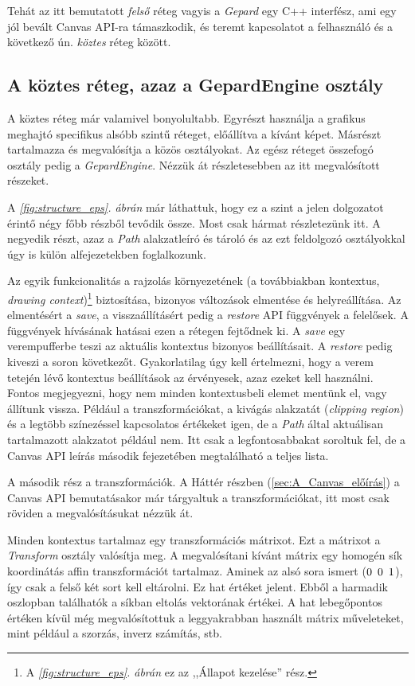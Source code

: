 \documentclass[12pt]{report}
\theoremstyle{definition}
\newcommand{\inenglish}[1]{\textsl{#1}}
\newcommand{\func}[1]{{\textsl{#1}}}
\begin{document}
Tehát az itt bemutatott \emph{felső} réteg vagyis a \func{Gepard} egy C++
interfész, ami egy jól bevált Canvas API-ra támaszkodik, és teremt kapcsolatot
a felhasználó és a következő ún. \emph{köztes} réteg között.

    \subsection*{A köztes réteg, azaz a GepardEngine osztály}

A köztes réteg már valamivel bonyolultabb. Egyrészt használja a grafikus
meghajtó specifikus alsóbb szintű réteget, előállítva a kívánt képet. Másrészt
tartalmazza és megvalósítja a közös osztályokat. Az egész réteget összefogó
osztály pedig a \func{GepardEngine}. Nézzük át részletesebben az itt
megvalósított részeket.

A \emph{\ref{fig:structure_eps}. ábrán} már láthattuk, hogy ez a szint a jelen
dolgozatot érintő négy főbb részből tevődik össze. Most csak hármat
részletezünk itt. A negyedik részt, azaz a \emph{Path} alakzatleíró és tároló
és az ezt feldolgozó osztályokkal úgy is külön alfejezetekben foglalkozunk.

Az egyik funkcionalitás a rajzolás környezetének (a továbbiakban kontextus,
\inenglish{drawing context})\footnote{A \emph{\ref{fig:structure_eps}. ábrán} ez az
,,Állapot kezelése'' rész.} biztosítása, bizonyos változások elmentése és
helyreállítása. Az elmentésért a \func{save}, a visszaállításért pedig a
\func{restore} API függvények a felelősek. A függvények hívásának hatásai ezen
a rétegen fejtődnek ki. A \func{save} egy verempufferbe teszi az aktuális
kontextus bizonyos beállításait. A \func{restore} pedig kiveszi a soron
következőt. Gyakorlatilag úgy kell értelmezni, hogy a verem tetején lévő
kontextus beállítások az érvényesek, azaz ezeket kell használni. Fontos
megjegyezni, hogy nem minden kontextusbeli elemet mentünk el, vagy állítunk
vissza. Például a transzformációkat, a kivágás alakzatát (\inenglish{clipping
region}) és a legtöbb színezéssel kapcsolatos értékeket igen, de a \emph{Path}
által aktuálisan tartalmazott alakzatot például nem. Itt csak a
legfontosabbakat soroltuk fel, de a Canvas API leírás \cite{Cabanier:14:HCC}
második fejezetében megtalálható a teljes lista.

A második rész a transzformációk. A Háttér részben (\ref{sec:A_Canvas_előírás}) a
Canvas API bemutatásakor már tárgyaltuk a transzformációkat, itt most csak
röviden a megvalósításukat nézzük át.

Minden kontextus tartalmaz egy transzformációs mátrixot. Ezt a mátrixot a
\func{Transform} osztály valósítja meg. A megvalósítani kívánt mátrix egy
homogén sík koordinátás affin transzformációt tartalmaz. Aminek az alsó sora
ismert ($0\enskip 0\enskip 1$), így csak a felső két sort kell eltárolni. Ez
hat értéket jelent. Ebből a harmadik oszlopban találhatók a síkban eltolás
vektorának értékei. A hat lebegőpontos értéken kívül még megvalósítottuk a
leggyakrabban használt mátrix műveleteket, mint például a szorzás, inverz
számítás, stb.
\end{document}

